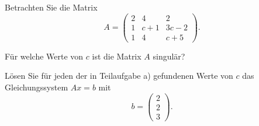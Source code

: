 Betrachten Sie die Matrix
\[
A=\begin{pmatrix}
2&  4&   2\\
1&c+1&3c-2\\
1&  4& c+5
\end{pmatrix}.
\]
\begin{teilaufgaben}
\item Für welche Werte von $c$ ist die Matrix $A$ singulär?
\item Lösen Sie für jeden der in Teilaufgabe a) gefundenen Werte von $c$ 
das Gleichungssystem $Ax=b$ mit
\[
b=\begin{pmatrix}2\\2\\3\end{pmatrix}.
\]
\end{teilaufgaben}

